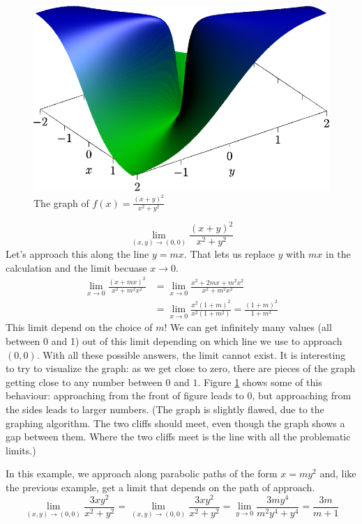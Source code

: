 \documentclass[fleqn,letterpaper]{report}
\begin{document}
\begin{figure}[t]
\centering
\includegraphics[width=12cm]{figure38.eps}
\caption{The graph of $f(x) = \frac{(x+y)^2}{x^2+y^2}$}
\label{figure-3d-graph2}
\end{figure}

\begin{example}
\begin{equation*}
\lim_{(x,y) \rightarrow (0,0)} \frac{(x+y)^2}{x^2 + y^2} 
\end{equation*}
Let's approach this along the line $y = mx$. That lets us
replace $y$ with $mx$ in the calculation and the limit becuase
$x \rightarrow 0$.
\begin{align*}
\lim_{x \rightarrow 0} \frac{(x+mx)^2}{x^2 + m^2x^2}
& = \lim_{x \rightarrow 0} 
\frac{x^2 + 2mx + m^2 x^2}{x^2 + m^2 x^2} \\
& = \lim_{x \rightarrow 0}
\frac{x^2(1+m)^2}{x^2(1+m^2)} = \frac{(1+m)^2}{1+m^2}
\end{align*}
This limit depend on the choice of $m$!
We can get infinitely many values (all between 0
and 1) out of this limit depending on which line we use to
approach $(0,0)$. With all these possible answers, the limit
cannot exist. It is interesting to try to visualize the graph:
as we get close to zero, there are pieces of the graph getting
close to any number between $0$ and $1$. Figure \ref{figure-3d-graph2}
shows some of this behaviour: approaching from the front of
figure leads to $0$, but approaching from the sides leads to
larger numbers. (The graph is slightly flawed, due to
the graphing algorithm. The two cliffs should meet, even
though the graph shows a gap between them. Where the two
cliffs meet is the line with all the problematic limits.)
\end{example}

\begin{example}
In this example, we approach along parabolic paths of the form
$ x = m y^2$ and, like the previous example, get a limit that
depends on the path of approach. 
\begin{equation*}
\lim_{(x,y) \rightarrow (0,0)} \frac{3xy^2}{x^2 + y^2} = 
\lim_{(x,y) \rightarrow (0,0)} \frac{3xy^2}{x^2 + y^2} 
= \lim_{y \rightarrow 0} \frac{3my^4}{m^2 y^4 + y^4}
= \frac{3m}{m+1} 
\end{equation*}
\end{example}
\end{document}
